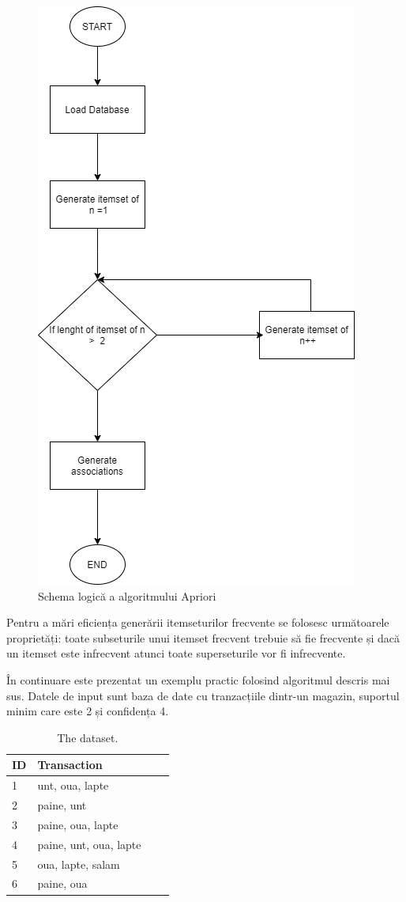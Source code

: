 \documentclass[11pt]{diazessay} %
\begin{document}
\begin{figure}[h]
	\centering
	\caption{Schema logică a algoritmului Apriori}
	\includegraphics[scale=0.40]{apriori.png}   	
\end{figure}

Pentru a mări eficiența generării itemseturilor frecvente se folosesc următoarele proprietăți: toate subseturile unui itemset frecvent trebuie să fie frecvente și dacă un itemset este infrecvent atunci toate superseturile vor fi infrecvente.

În continuare este prezentat un exemplu practic folosind algoritmul descris mai sus. Datele de input sunt baza de date cu tranzacțiile dintr-un magazin, suportul minim care este 2 și confidența 4.

\begin{table}[h]
\caption{The dataset.}
\centering
\begin{tabular}{llll}
		\toprule
		\cmidrule(r){1-2}
		ID & Transaction \\
		\midrule
		1 & unt, oua, lapte &  \\
		2 & paine, unt &  \\
      	3& paine, oua, lapte &  \\
      	4& paine, unt, oua, lapte  &  \\
      	5& oua, lapte, salam  &  \\
      	6& paine, oua  & 
\end{tabular}
\end{table}
\end{document}
